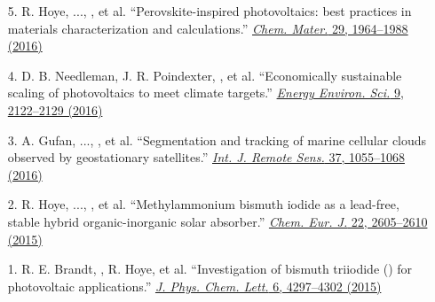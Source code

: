 \begin{enumerate}
        \item[5.] R. Hoye, ..., \myname, et al. ``Perovskite-inspired photovoltaics: best practices in materials characterization and calculations.'' \href{https://pubs.acs.org/doi/10.1021/acs.chemmater.6b03852}{\textit{Chem. Mater.} 29, 1964--1988 (2016)}

        \item[4.] D. B. Needleman, J. R. Poindexter, \myname, et al. ``Economically sustainable scaling of photovoltaics to meet climate targets.'' \href{https://pubs.rsc.org/en/content/articlelanding/2016/EE/C6EE00484A}{\textit{Energy Environ. Sci.} 9, 2122--2129 (2016)}

        \item[3.] A. Gufan, ..., \myname, et al. ``Segmentation and tracking of marine cellular clouds observed by geostationary satellites.'' \href{https://www.tandfonline.com/doi/full/10.1080/2150704X.2016.1142681?cookieSet=1}{\textit{Int. J. Remote Sens.} 37, 1055--1068 (2016)}

        \item[2.] R. Hoye, ..., \myname, et al. ``Methylammonium bismuth iodide as a lead-free, stable hybrid organic-inorganic solar absorber.'' \href{http://doi.wiley.com/10.1002/chem.201505055}{\textit{Chem. Eur. J.} 22, 2605--2610 (2015)}

        \item[1.] R. E. Brandt, \myname, R. Hoye, et al. ``Investigation of bismuth triiodide () for photovoltaic applications.'' \href{https://pubs.acs.org/doi/full/10.1021/acs.jpclett.5b02022}{\textit{J. Phys. Chem. Lett.} 6, 4297--4302 (2015)}
\end{enumerate}


